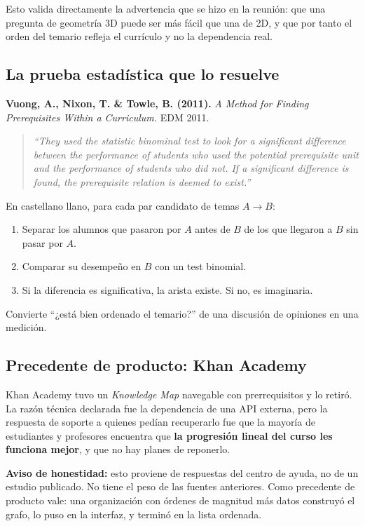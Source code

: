 \documentclass[11pt,a4paper]{article}
\newcommand{\cita}[1]{\begin{quote}\itshape\small #1\end{quote}}
\begin{document}
Esto valida directamente la advertencia que se hizo en la reunión: que una pregunta de geometría 3D puede ser más fácil que una de 2D, y que por tanto el orden del temario refleja el currículo y no la dependencia real.

\subsection{La prueba estadística que lo resuelve}

\textbf{Vuong, A., Nixon, T. \& Towle, B. (2011).} \emph{A Method for Finding Prerequisites Within a Curriculum.} EDM 2011.

\cita{``They used the statistic binominal test to look for a significant difference between the performance of students who used the potential prerequisite unit and the performance of students who did not. If a significant difference is found, the prerequisite relation is deemed to exist.''}

En castellano llano, para cada par candidato de temas $A \rightarrow B$:

\begin{enumerate}
\item Separar los alumnos que pasaron por $A$ antes de $B$ de los que llegaron a $B$ sin pasar por $A$.
\item Comparar su desempeño en $B$ con un test binomial.
\item Si la diferencia es significativa, la arista existe. Si no, es imaginaria.
\end{enumerate}

Convierte ``¿está bien ordenado el temario?'' de una discusión de opiniones en una medición.

\subsection{Precedente de producto: Khan Academy}

Khan Academy tuvo un \emph{Knowledge Map} navegable con prerrequisitos y lo retiró. La razón técnica declarada fue la dependencia de una API externa, pero la respuesta de soporte a quienes pedían recuperarlo fue que la mayoría de estudiantes y profesores encuentra que \textbf{la progresión lineal del curso les funciona mejor}, y que no hay planes de reponerlo.

{\small\textbf{Aviso de honestidad:} esto proviene de respuestas del centro de ayuda, no de un estudio publicado. No tiene el peso de las fuentes anteriores. Como precedente de producto vale: una organización con órdenes de magnitud más datos construyó el grafo, lo puso en la interfaz, y terminó en la lista ordenada.}
\end{document}
